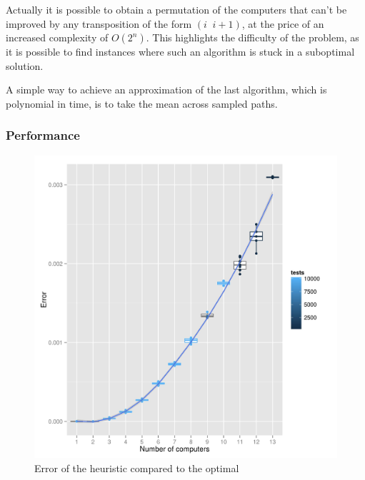 \documentclass[11pt]{llncs}
\begin{document}
		Actually it is possible to obtain a permutation of the computers that can't be improved by any transposition of the form  $(i\;\; i+1)$, at the price of an increased complexity of $O(2^n)$. This highlights the difficulty of the problem, as it is possible to find instances where such an algorithm is stuck in a suboptimal solution.
		
		A simple way to achieve an approximation of the last algorithm, which is polynomial in time, is to take the mean across sampled paths.
		
		\subsubsection{Performance}
		
		\begin{figure}
		\includegraphics{boxexheur.jpg} %
		\caption{Error of the heuristic compared to the optimal}
		\end{figure}
		
\end{document}
